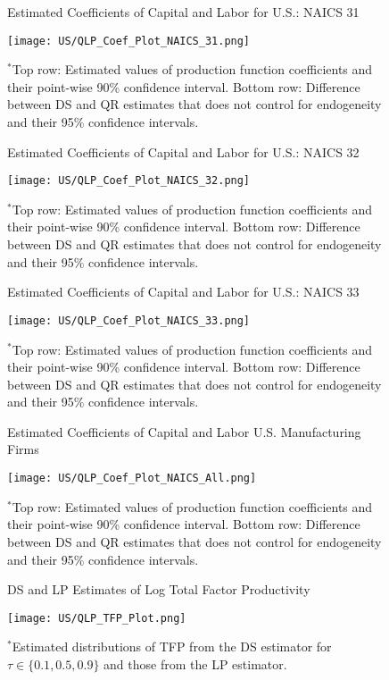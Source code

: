 \documentclass[12pt]{article}
\begin{document}
\begin{appendices}
\begin{figure}[H]
\centering
\caption{Estimated Coefficients of Capital and Labor for U.S.: NAICS 31}
\texttt{[image: US/QLP\_Coef\_Plot\_NAICS\_31.png]}
\caption*{\footnotesize $^{*}$Top row: Estimated values of production function coefficients and their point-wise 90\% confidence interval. Bottom row: Difference between DS and QR estimates that does not control for endogeneity and their 95\% confidence intervals.}
\label{fig:QLPUS31}
\end{figure}

\begin{figure}[H]
\centering
\caption{Estimated Coefficients of Capital and Labor for U.S.: NAICS 32}
\texttt{[image: US/QLP\_Coef\_Plot\_NAICS\_32.png]}
\caption*{\footnotesize $^{*}$Top row: Estimated values of production function coefficients and their point-wise 90\% confidence interval. Bottom row: Difference between DS and QR estimates that does not control for endogeneity and their 95\% confidence intervals.}
\label{fig:QLPUS32}
\end{figure}

\begin{figure}[H]
\centering
\caption{Estimated Coefficients of Capital and Labor for U.S.: NAICS 33}
\texttt{[image: US/QLP\_Coef\_Plot\_NAICS\_33.png]}
\caption*{\footnotesize $^{*}$Top row: Estimated values of production function coefficients and their point-wise 90\% confidence interval. Bottom row: Difference between DS and QR estimates that does not control for endogeneity and their 95\% confidence intervals.}
\label{fig:QLPUS33}
\end{figure}

\begin{figure}[H]
\centering
\caption{Estimated Coefficients of Capital and Labor U.S. Manufacturing Firms}
\texttt{[image: US/QLP\_Coef\_Plot\_NAICS\_All.png]}
\caption*{\footnotesize $^{*}$Top row: Estimated values of production function coefficients and their point-wise 90\% confidence interval. Bottom row: Difference between DS and QR estimates that does not control for endogeneity and their 95\% confidence intervals.}
\label{fig:QLPUSall}
\end{figure}

\begin{figure}[H]
\centering
\caption{DS and LP Estimates of Log Total Factor Productivity}
\texttt{[image: US/QLP\_TFP\_Plot.png]}
\caption*{\footnotesize $^{*}$Estimated distributions of TFP from the DS estimator for $\tau \in \{0.1, 0.5, 0.9\}$ and those from  the LP estimator.}
\label{fig:QLPUSTFP}
\end{figure}


\end{appendices}
\end{document}
